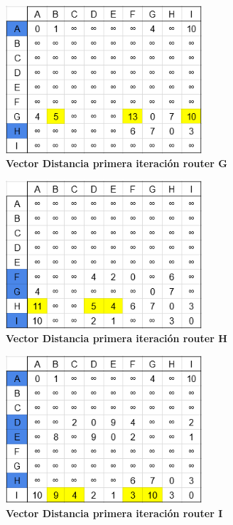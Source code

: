 \documentclass[12pt]{article}
\begin{document}
\begin{figure}[H] 
\centering 
\includegraphics[width=0.65\textwidth]{imagenes/2G1.png} \caption{\small \textbf{Vector Distancia primera iteración router G}}
\label{fig:diagrama_23} 
\end{figure}
\begin{figure}[H] 
\centering 
\includegraphics[width=0.65\textwidth]{imagenes/2H1.png} \caption{\small \textbf{Vector Distancia primera iteración router H}}
\label{fig:diagrama_24} 
\end{figure}
\begin{figure}[H] 
\centering 
\includegraphics[width=0.65\textwidth]{imagenes/2I1.png} \caption{\small \textbf{Vector Distancia primera iteración router I}}
\label{fig:diagrama_25} 
\end{figure}
\end{document}
